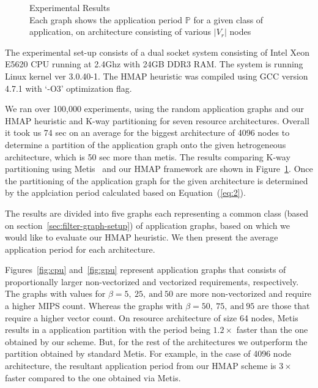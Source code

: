 \begin{figure}[ht!]
{    \label{fig:overall}
  }
  \caption{Experimental Results\\ \footnotesize{Each graph shows the
  application period $\mathbb{P}$ for a given class of application, on
  architecture consisting of various $|V_r|$ nodes}}
  \label{fig:exp-res}
\end{figure}

The experimental set-up consists of a dual socket system consisting of
Intel Xeon E5620 CPU running at 2.4Ghz with 24GB DDR3 RAM. The system
is running Linux kernel ver 3.0.40-1. The HMAP heuristic was compiled
using GCC version 4.7.1 with `-O3' optimization flag.

We ran over 100,000 experiments, using the random application graphs and
our HMAP heuristic and K-way partitioning for seven resource architectures.
Overall it took us 74 sec on an average for the biggest architecture of 4096
nodes to determine a partition of the application graph onto the given
hetrogeneous architecture, which is 50 sec more than metis.
The results comparing K-way partitioning using Metis~\cite{gkar95} and our HMAP
framework are shown in Figure~\ref{fig:exp-res}. Once the partitioning of the
application graph for the given architecture is determined by the applciation
period calculated based on Equation~(\ref{eq:2}).

The results are divided into five graphs each representing a common
class (based on section~\ref{sec:filter-graph-setup}) of application
graphs, based on which we would like to evaluate our HMAP heuristic. We then
present the average application period for each architecture.

Figures~\ref{fig:cpu} and~\ref{fig:gpu} represent application graphs
that consists of proportionally larger non-vectorized and vectorized
requirements, respectively. The graphs with values for $\beta = 5,\ 25,\
\mathrm{and}\ 50$ are more non-vectorized and require a higher MIPS
count. Whereas the graphs with $\beta = 50,\ 75,\ \mathrm{and}\ 95$ are
those that require a higher vector count. On resource architecture of size 64
nodes, Metis results in a application partition with the period being
$1.2\times$ faster than the one obtained by our scheme. But, for the
rest of the architectures we outperform the partition obtained by
standard Metis. For example, in the case of 4096 node architecture, the
resultant application period from our HMAP scheme is $3\times$ faster
compared to the one obtained via Metis.


